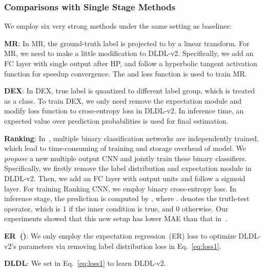 \documentclass[5p,times,twocolumn]{elsarticle}
\newcommand{\squishlist}{
 \begin{list}{}
  { \setlength{\itemsep}{0pt}
     \setlength{\parsep}{1pt}
     \setlength{\topsep}{1pt}
     \setlength{\partopsep}{0pt}
     \setlength{\leftmargin}{1.5em}
     \setlength{\labelwidth}{1em}
     \setlength{\labelsep}{0.5em} } }
\newcommand{\squishend}{
  \end{list}  }
\begin{document}
\subsubsection{Comparisons with Single Stage Methods}
We employ six very strong methods under the same setting as baselines: 

\squishlist
 \item \textbf{MR}: In MR, the ground-truth label  is projected to  by a linear transform. For MR, we need to make a little modification to DLDL-v2. Specifically, we add an FC layer with single output after HP, and follow a hyperbolic tangent activation function  for speedup convergence. The  and  loss function is used to train MR. 
 
 \item \textbf{DEX}: In DEX, true label  is quantized to different label group, which is treated as a class. To train DEX, we only need remove the expectation module and modify loss function to cross-entropy loss in DLDL-v2. In inference time, an expected value over prediction probabilities is used for final estimation.

 \item \textbf{Ranking}: In~\cite{chen2017using,Chen2017Deep}, multiple binary classification networks are independently trained, which lead to time-consuming of training and storage overhead of model. We \emph{propose} a new multiple output CNN and jointly train these binary classifiers. Specifically, we firstly remove the label distribution and expectation module in DLDL-v2. Then, we add an FC layer with  output units and follow a sigmoid layer. For training Ranking CNN, we employ  binary cross-entropy loss. In inference stage, the prediction is computed by , where .  denotes the truth-test operator, which is 1 if the inner condition is true, and 0 otherwise. Our experiments showed that this new setup has lower MAE than that in~\cite{niu2016ordinal,chen2017using,Chen2017Deep}.
 \item \textbf{ER~()}: We only employ the expectation regression~(ER) loss  to optimize DLDL-v2's parameters via removing label distribution loss  in Eq.~\eqref{eq:loss1}.
 \item \textbf{DLDL}: We set  in Eq.~\eqref{eq:loss1} to learn DLDL-v2.
\squishend
\end{document}

